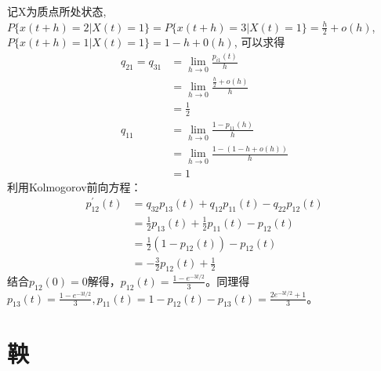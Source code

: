 \begin{enumerate}
	      记X为质点所处状态,\(P\{x(t+h)=2|X(t)=1\}=P\{x(t+h)=3|X(t)=1\}=\frac{h}{2}+o(h)\),\(P\{x(t+h)=1|X(t)=1\}=1-h+0(h)\),
	      可以求得
	      \begin{align*}
		      q_{21}=q_{31}
		       & =\lim_{h\to 0}\frac{p_{i1}(t)}{h}        \\
		       & =\lim_{h\to 0}\frac{\frac{h}{2}+o(h)}{h} \\
		       & =\frac{1}{2}                             \\
		      q_{11}
		       & =\lim_{h\to 0}\frac{1-p_{11}(h)}{h}      \\
		       & =\lim_{h\to 0}\frac{1-(1-h+o(h))}{h}     \\
		       & =1
	      \end{align*}
	      利用Kolmogorov前向方程：
	      \begin{align*}
		      p^{\prime}_{12}(t)
		       & =q_{32}p_{13}(t)+q_{12}p_{11}(t)-q_{22}p_{12}(t)     \\
		       & =\frac{1}{2}p_{13}(t)+\frac{1}{2}p_{11}(t)-p_{12}(t) \\
		       & =\frac{1}{2}(1-p_{12}(t))-p_{12}(t)                  \\
		       & =-\frac{3}{2}p_{12}(t)+\frac{1}{2}
	      \end{align*}
	      结合\(p_{12}(0)=0\)解得，\(p_{12}(t)=\frac{1-e^{-3t/2}}{3}\)。同理得\(p_{13}(t)=\frac{1-e^{-3t/2}}{3},p_{11}(t)=1-p_{12}(t)-p_{13}(t)=\frac{2e^{-3t/2}+1}{3}\)。
\end{enumerate}

\section{鞅}


